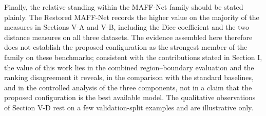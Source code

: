 Finally, the relative standing within the MAFF-Net family should be stated plainly. The Restored MAFF-Net records the higher value on the majority of the measures in Sections V-A and V-B, including the Dice coefficient and the two distance measures on all three datasets. The evidence assembled here therefore does not establish the proposed configuration as the strongest member of the family on these benchmarks; consistent with the contributions stated in Section I, the value of this work lies in the combined region--boundary evaluation and the ranking disagreement it reveals, in the comparison with the standard baselines, and in the controlled analysis of the three components, not in a claim that the proposed configuration is the best available model. The qualitative observations of Section V-D rest on a few validation-split examples and are illustrative only.
